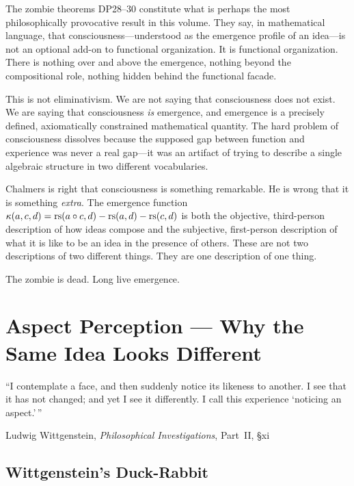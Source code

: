 The zombie theorems DP28--30 constitute what is perhaps the most
philosophically provocative result in this volume.  They say, in
mathematical language, that consciousness---understood as the
emergence profile of an idea---is not an optional add-on to
functional organization.  It is functional organization.  There is
nothing over and above the emergence, nothing beyond the
compositional role, nothing hidden behind the functional facade.

This is not eliminativism.  We are not saying that consciousness
does not exist.  We are saying that consciousness \emph{is}
emergence, and emergence is a precisely defined, axiomatically
constrained mathematical quantity.  The hard problem of
consciousness dissolves because the supposed gap between function
and experience was never a real gap---it was an artifact of trying to
describe a single algebraic structure in two different vocabularies.

Chalmers is right that consciousness is something remarkable.
He is wrong that it is something \emph{extra}.  The emergence
function $\kappa(a, c, d) = \mathrm{rs}(a \circ c, d) - \mathrm{rs}(a, d) - \mathrm{rs}(c, d)$
is both the objective, third-person description of how ideas compose
and the subjective, first-person description of what it is like to
be an idea in the presence of others.  These are not two descriptions
of two different things.  They are one description of one thing.

The zombie is dead.  Long live emergence.



\chapter{Aspect Perception --- Why the Same Idea Looks Different}
\label{ch:aspect-perception}

\epigraph{``I contemplate a face, and then suddenly notice its likeness to
another.  I see that it has not changed; and yet I see it differently.
I call this experience `noticing an aspect.'\,''}{Ludwig Wittgenstein, \textit{Philosophical Investigations}, Part~II, \S xi}

\section{Wittgenstein's Duck-Rabbit}

